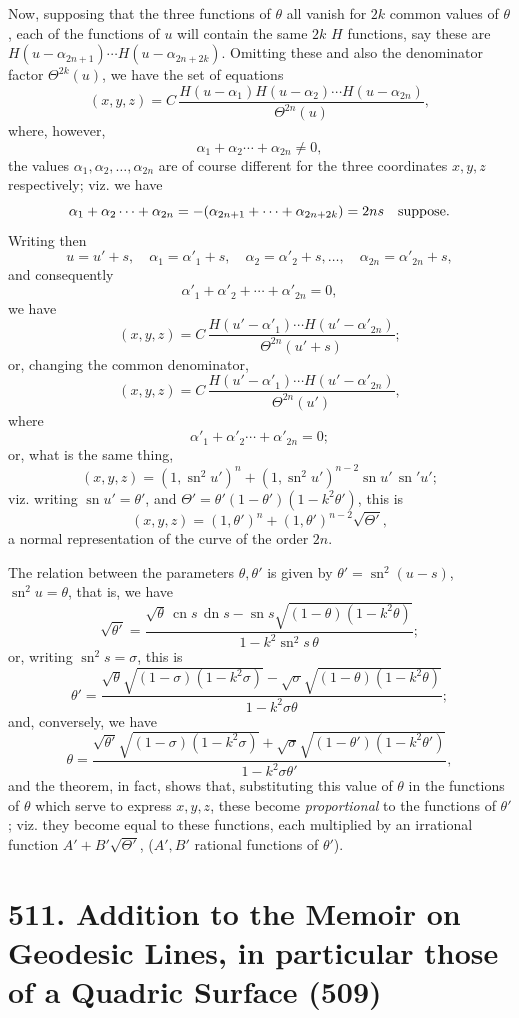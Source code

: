 \documentclass[11pt,a4paper]{article}
\newcommand{\paperid}[1]{\par\medskip\noindent{\bfseries [#1]}\quad}
\newcommand{\sn}{\operatorname{sn}}
\newcommand{\cn}{\operatorname{cn}}
\newcommand{\dn}{\operatorname{dn}}
\begin{document}
Now, supposing that the three functions of $\theta$ all vanish for $2k$ common values of
$\theta$, each of the functions of $u$ will contain the same $2k$ $H$ functions, say these
are $H(u-\alpha_{2n+1})\cdots H(u-\alpha_{2n+2k})$. Omitting these and also the denominator
factor $\Theta^{2k}(u)$, we have the set of equations
\[
 (x,y,z)=C\,\frac{H(u-\alpha_1)H(u-\alpha_2)\cdots H(u-\alpha_{2n})}{\Theta^{2n}(u)},
\]
where, however,
\[
 \alpha_1+\alpha_2\cdots+\alpha_{2n}\ne0,
\]
the values $\alpha_1,\alpha_2,\ldots,\alpha_{2n}$ are of course different for the three
coordinates $x,y,z$ respectively; viz. we have
\[
 \alpha_1+\alpha_2\cdots+\alpha_{2n}
 =-(\alpha_{2n+1}+\cdots+\alpha_{2n+2k})=2ns\quad\hbox{suppose.}
\]
Writing then
\[
 u=u'+s,\quad \alpha_1=\alpha'_1+s,\quad \alpha_2=\alpha'_2+s,\ldots,\quad
 \alpha_{2n}=\alpha'_{2n}+s,
\]
and consequently
\[
 \alpha'_1+\alpha'_2+\cdots+\alpha'_{2n}=0,
\]
we have
\[
 (x,y,z)=C\,\frac{H(u'-\alpha'_1)\cdots H(u'-\alpha'_{2n})}{\Theta^{2n}(u'+s)};
\]
or, changing the common denominator,
\[
 (x,y,z)=C\,\frac{H(u'-\alpha'_1)\cdots H(u'-\alpha'_{2n})}{\Theta^{2n}(u')},
\]
where
\[
 \alpha'_1+\alpha'_2\cdots+\alpha'_{2n}=0;
\]
or, what is the same thing,
\[
 (x,y,z)=(1,\sn^2u')^n+(1,\sn^2u')^{n-2}\sn u'\,\sn' u';
\]
viz. writing $\sn u'=\theta'$, and $\Theta'=\theta'(1-\theta')(1-k^2\theta')$, this is
\[
 (x,y,z)=(1,\theta')^n+(1,\theta')^{n-2}\sqrt{\Theta'},
\]
a normal representation of the curve of the order $2n$.

The relation between the parameters $\theta,\theta'$ is given by
$\theta'=\sn^2(u-s)$, $\sn^2u=\theta$, that is, we have
\[
 \sqrt{\theta'}=
 \frac{\sqrt\theta\,\cn s\,\dn s-\sn s\sqrt{(1-\theta)(1-k^2\theta)}}
 {1-k^2\sn^2s\,\theta};
\]
or, writing $\sn^2s=\sigma$, this is
\[
 \theta'=
 \frac{\sqrt\theta\sqrt{(1-\sigma)(1-k^2\sigma)}
 -\sqrt\sigma\sqrt{(1-\theta)(1-k^2\theta)}}{1-k^2\sigma\theta};
\]
and, conversely, we have
\[
 \theta=
 \frac{\sqrt{\theta'}\sqrt{(1-\sigma)(1-k^2\sigma)}
 +\sqrt\sigma\sqrt{(1-\theta')(1-k^2\theta')}}
 {1-k^2\sigma\theta'},
\]
and the theorem, in fact, shows that, substituting this value of $\theta$ in the functions
of $\theta$ which serve to express $x,y,z$, these become \emph{proportional} to the functions
of $\theta'$; viz. they become equal to these functions, each multiplied by an irrational
function $A'+B'\sqrt{\Theta'}$, ($A',B'$ rational functions of $\theta'$).

\paperid{511}
\section*{511. Addition to the Memoir on Geodesic Lines, in particular those of a Quadric Surface (509)}
\end{document}
